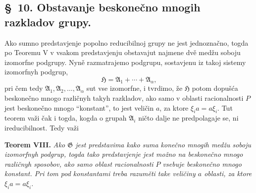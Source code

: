 \documentclass[11pt]{article}
\begin{document}

\setcounter{footnote}{19}
\subsection*{\S~10. Obstavanje beskonečno mnogih razkladov grupy.}

Ako sumno predstavjenje popolno reducibilnoj grupy ne jest jednoznačno, togda po Teoremu V v vsakom predstavjenju obstavajut najmene dvě medžu soboju izomorfne podgrupy. Nyně razmatrajemo podgrupu, sostavjenu iz takoj sistemy izomorfnyh podgrup,
\[
  \mathfrak H=\mathfrak A_1+\cdots+\mathfrak A_\alpha,
\]
pri čem tedy \(\mathfrak A_1,\mathfrak A_2,\ldots,\mathfrak A_\alpha\) sut vse izomorfne, i tvrdimo, že \(\mathfrak H\) potom dopušća beskonečno mnogo različnyh takyh razkladov, ako samo v oblasti racionalnosti \(P\) jest beskonečno mnogo ``konstant'', to jest veličin \(a\), za ktore \(\xi_i a=a\xi_i\). Tut teorem važi čak i togda, kogda o grupah \(\mathfrak A_i\) ničto dalje ne predpolagaje se, ni ireducibilnost. Tedy važi

\textbf{Teorem VIII.} \textit{Ako \(\mathfrak G\) jest predstavima kako suma konečno mnogih medžu soboju izomorfnyh podgrup, togda tako predstavjenje jest možno na beskonečno mnogo različnyh sposobov, ako samo oblast racionalnosti \(P\) vsebuje beskonečno mnogo konstant. Pri tom pod konstantami treba razuměti take veličiny \(a\) oblasti, za ktore \(\xi_i a=a\xi_i\).}
\end{document}
